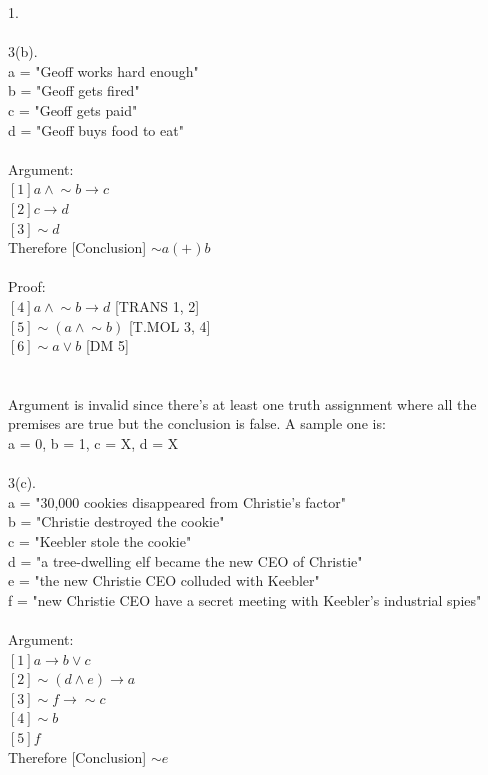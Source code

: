 \documentclass[a4paper, 20pt]{article}
\def\lnot{\mathop{\sim}}
\begin{document}
\begin{question}{1.}
\\
\\3(b).
\\ a = "Geoff works hard enough"
\\ b = "Geoff gets fired"
\\ c = "Geoff gets paid"
\\ d = "Geoff buys food to eat"
\\
\\Argument:
\\$[1] a \land \lnot b \rightarrow c$
\\$[2] c \rightarrow d$
\\$[3] \lnot d$
\\ Therefore [Conclusion] $\lnot a (+) b$
\\
\\Proof:
\\$[4] a \land \lnot b \rightarrow d$ [TRANS 1, 2]
\\$[5] \lnot (a \land \lnot b)$ [T.MOL 3, 4]
\\$[6] \lnot a \lor b$ [DM 5]
\\ \boxed{}
\\
\\ Argument is invalid since there's at least one truth assignment where all the premises are true but the conclusion is false. A sample one is:
\\ a = 0, b = 1, c = X, d = X
\\
\\3(c).
\\ a = "30,000 cookies disappeared from Christie’s factor"
\\ b = "Christie destroyed the cookie"
\\ c = "Keebler stole the cookie"
\\ d = "a tree-dwelling elf became the new CEO of Christie"
\\ e = "the new Christie CEO colluded with Keebler"
\\ f = "new Christie CEO have a secret meeting with Keebler’s industrial spies"
\\
\\Argument:
\\ $[1] a \rightarrow b \lor c$
\\ $[2] \lnot (d \land e) \rightarrow a$
\\ $[3] \lnot f \rightarrow \lnot c$
\\ $[4] \lnot b$
\\ $[5] f$
\\ Therefore [Conclusion] $\lnot e$
\\

\end{question}
\end{document}
